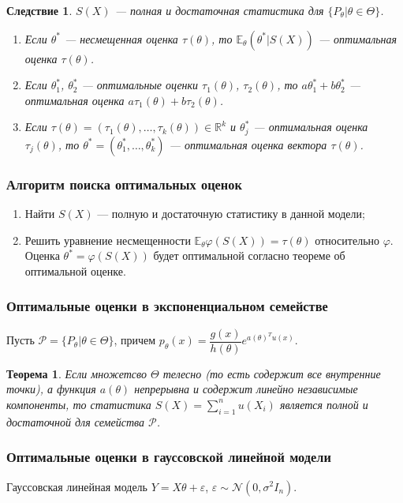 \documentclass[12pt]{report}
\newtheorem{theorem}{Теорема}
\newtheorem{corollary}{Следствие}
\theoremstyle{definition}
\begin{document}
\begin{corollary}
	$S(X)$ — полная и достаточная статистика для $\{P_\theta | \theta \in \Theta\}$.
	\begin{enumerate}
		\item Если $\theta^*$ — несмещенная оценка $\tau(\theta)$, то $\mathbb{E}_\theta (\theta^* | S(X))$ — оптимальная оценка $\tau(\theta)$.
		\item Если $\theta^*_1$, $\theta^*_2$ — оптимальные оценки $\tau_1(\theta)$, $\tau_2(\theta)$, то $a\theta^*_1 + b\theta^*_2$ — оптимальная оценка $a\tau_1(\theta) + b\tau_2(\theta)$.
		\item Если $\tau(\theta) = (\tau_1(\theta), \ldots, \tau_k(\theta)) \in \mathbb{R}^k$ и $\theta^*_j$ — оптимальная оценка $\tau_j(\theta)$, то $\theta^* = (\theta^*_1, \ldots, \theta^*_k)$ — оптимальная оценка вектора $\tau(\theta)$.
	\end{enumerate}
\end{corollary}
\subsubsection{Алгоритм поиска оптимальных оценок}
\begin{enumerate}
	\item Найти $S(X)$ — полную и достаточную статистику в данной модели;
	\item Решить уравнение несмещенности $\mathbb{E}_\theta \varphi(S(X)) = \tau(\theta)$ относительно $\varphi$. Оценка $\theta^* = \varphi(S(X))$ будет оптимальной согласно теореме об оптимальной оценке. 
\end{enumerate}

\subsubsection{Оптимальные оценки в экспоненциальном семействе}
Пусть $\mathscr{P} = \{P_\theta|\theta \in \Theta\}$, причем $p_\theta(x) = \dfrac{g(x)}{h(\theta)}e^{a(\theta)^Tu(x)}$.
\begin{theorem}
	Если множетсво $\Theta$ телесно (то есть содержит все внутренние точки), а функция $a(\theta)$ непрерывна и содержит линейно независимые компоненты, то статистика $S(X) = \displaystyle{\sum_{i=1}^n}u(X_i)$ является полной и достаточной для семейства $\mathscr{P}$.
\end{theorem}

\subsubsection{Оптимальные оценки в гауссовской линейной модели}
Гауссовская линейная модель $Y = X\theta + \varepsilon$, $\varepsilon \sim \mathcal{N}(0, \sigma^2 I_n)$.
\end{document}
